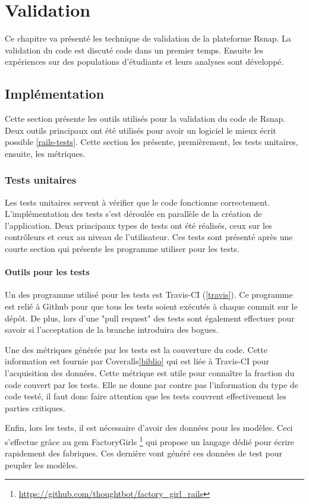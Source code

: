 \chapter{Validation}
Ce chapitre va présenté les technique de validation de la plateforme Rsnap. La validation du code est discuté code dans un premier temps. Ensuite les expériences sur des populations d'étudiants et leurs analyses sont développé.

\section{Implémentation}
Cette section présente les outils utilisés pour la validation du code de Rsnap. Deux outils principaux ont été utilisés pour avoir un logiciel le mieux écrit possible \ref{rails-tests}. Cette section les présente, premièrement, les tests unitaires, ensuite, les métriques.

\subsection{Tests unitaires}
Les tests unitaires servent à vérifier que le code fonctionne correctement. L'implémentation des tests s'est déroulée en parallèle de la création de l'application. Deux principaux types de tests ont été réalisés, ceux sur les contrôleurs et ceux au niveau de l'utilisateur. Ces tests sont présenté après une courte section qui présente les programme utiliser pour les tests.

\subsubsection{Outils pour les tests}
Un des programme utilisé pour les tests est Travis-CI (\ref{travis}). Ce programme est relié à Github pour que tous les tests soient exécutés à chaque commit sur le dépôt. De plus, lors d'une "pull request" des tests sont également effectuer pour savoir si l'acceptation de la branche introduira des bogues.

Une des métriques générée par les tests est la couverture du code. Cette information est fournie par Coveralls\ref{biblio} qui est liée à Travis-CI pour l'acquisition des données. Cette métrique est utile pour connaître la fraction du code couvert par les tests. Elle ne donne par contre pas l'information du type de code testé, il faut donc faire attention que les tests couvrent effectivement les parties critiques.

Enfin, lors les tests, il est nécessaire d'avoir des données pour les modèles. Ceci s'effectue grâce au gem FactoryGirls \footnote{\url{https://github.com/thoughtbot/factory_girl_rails}} qui propose un langage dédié pour écrire rapidement des fabriques. Ces dernière vont généré ces données de test pour peupler les modèles.

